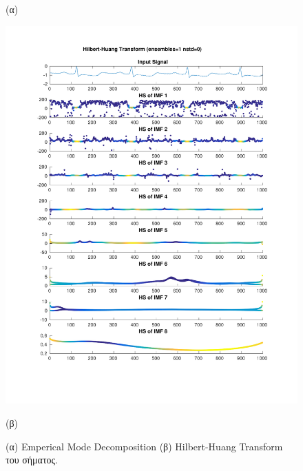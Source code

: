 \documentclass[11pt,a4paper]{article}
\begin{document}
\begin{figure}[H]
\begin{minipage}{0.48\textwidth}
	(α)
\end{minipage}
\begin{minipage}{0.48\textwidth}
	\centering
	\includegraphics[width=\textwidth]{fig/112l1_hht.pdf}
	
	(β)
\end{minipage}
\vfill
\caption{(α) Emperical Mode Decomposition (β) Hilbert-Huang Transform του σήματος.}
\label{fig:112l1_hht}
\end{figure}
\end{document}
